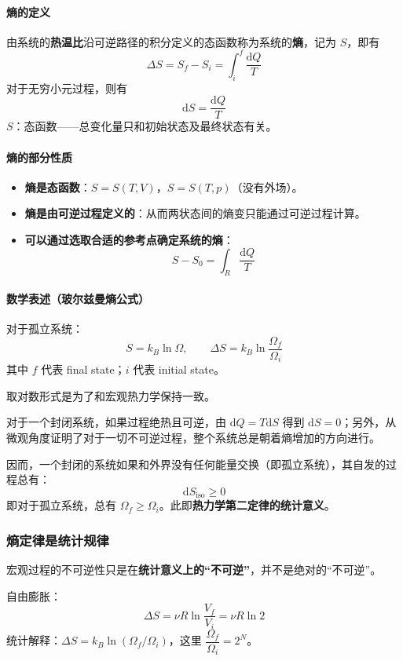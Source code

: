 \documentclass[UTF8]{ctexart}
\begin{document}
\paragraph{熵的定义}
由系统的\textbf{热温比}沿可逆路径的积分定义的态函数称为系统的\textbf{熵}，记为 $S$，即有
\[
\boxed{\Delta S=S_f-S_i=\int_i^f\frac{\mathrm{d}Q}{T}}
\]
对于无穷小元过程，则有
\[
\mathrm{d}S=\frac{\mathrm{d}Q}{T}
\]
$S$：态函数——总变化量只和初始状态及最终状态有关。

\paragraph{熵的部分性质}
\begin{itemize}[leftmargin=2em]
  \item \textbf{熵是态函数}：$S=S(T,V)$，$S=S(T,p)$（没有外场）。
  \item \textbf{熵是由可逆过程定义的}：从而两状态间的熵变只能通过可逆过程计算。
  \item \textbf{可以通过选取合适的参考点确定系统的熵}：
  \[
  S-S_0=\int_R\frac{\mathrm{d}Q}{T}
  \]
\end{itemize}

\paragraph{数学表述（玻尔兹曼熵公式）}
对于孤立系统：
\[
\boxed{S=k_B\ln\Omega},\qquad \Delta S=k_B\ln\frac{\Omega_f}{\Omega_i}
\]
其中 $f$ 代表 final state；$i$ 代表 initial state。

取对数形式是为了和宏观热力学保持一致。

对于一个封闭系统，如果过程绝热且可逆，由 $\mathrm{d}Q=T\mathrm{d}S$ 得到 $\mathrm{d}S=0$；另外，从微观角度证明了对于一切不可逆过程，整个系统总是朝着熵增加的方向进行。

因而，一个封闭的系统如果和外界没有任何能量交换（即孤立系统），其自发的过程总有：
\[
\boxed{\mathrm{d}S_{\mathrm{iso}}\ge 0}
\]
即对于孤立系统，总有 $\Omega_f\ge\Omega_i$。此即\textbf{热力学第二定律的统计意义}。

\subsubsection{熵定律是统计规律}

宏观过程的不可逆性只是在\textbf{统计意义上的``不可逆''}，并不是绝对的``不可逆''。

自由膨胀：
\[
\Delta S=\nu R\ln\frac{V_f}{V_i}=\nu R\ln 2
\]
统计解释：$\Delta S=k_B\ln(\Omega_f/\Omega_i)$，这里 $\dfrac{\Omega_f}{\Omega_i}=2^N$。
\end{document}
